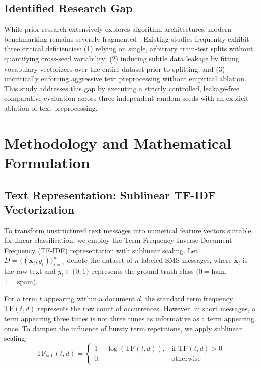 \documentclass[conference]{IEEEtran}
\begin{document}
\subsection{Identified Research Gap}
While prior research extensively explores algorithm architectures, modern benchmarking remains severely fragmented \cite{alsaidat2024advancements}. Existing studies frequently exhibit three critical deficiencies: (1) relying on single, arbitrary train-test splits without quantifying cross-seed variability; (2) inducing subtle data leakage by fitting vocabulary vectorizers over the entire dataset prior to splitting; and (3) uncritically enforcing aggressive text preprocessing without empirical ablation. This study addresses this gap by executing a strictly controlled, leakage-free comparative evaluation across three independent random seeds with an explicit ablation of text preprocessing.

\section{Methodology and Mathematical Formulation}

\subsection{Text Representation: Sublinear TF-IDF Vectorization}
To transform unstructured text messages into numerical feature vectors suitable for linear classification, we employ the Term Frequency-Inverse Document Frequency (TF-IDF) representation with sublinear scaling. Let $D = \{(\mathbf{x}_i, y_i)\}_{i=1}^n$ denote the dataset of $n$ labeled SMS messages, where $\mathbf{x}_i$ is the raw text and $y_i \in \{0, 1\}$ represents the ground-truth class ($0 = \text{ham}$, $1 = \text{spam}$).

For a term $t$ appearing within a document $d$, the standard term frequency $\text{TF}(t, d)$ represents the raw count of occurrences. However, in short messages, a term appearing three times is not three times as informative as a term appearing once. To dampen the influence of bursty term repetitions, we apply sublinear scaling:
\begin{equation}
\text{TF}_{\text{sub}}(t, d) = 
\begin{cases} 
1 + \log(\text{TF}(t, d)), & \text{if } \text{TF}(t, d) > 0 \\ 
0, & \text{otherwise} 
\end{cases}
\end{equation}
\end{document}
